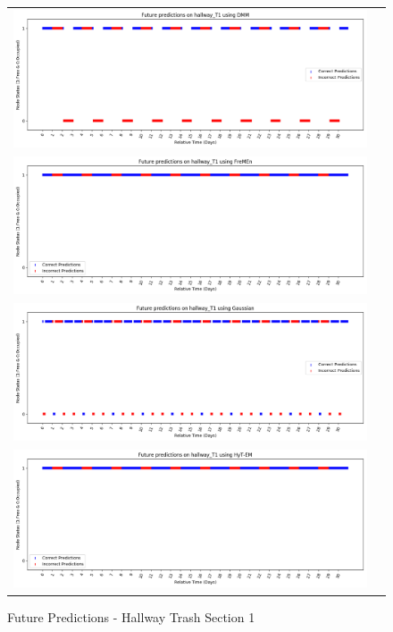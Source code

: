 \begin{center}
\begin{figure}[!Hp]
  \begin{tabular}{cc}
    {\includegraphics[width = 6in]{images/results/Future_hallway_T1_DMM.png}} \\
    {\includegraphics[width = 6in]{images/results/Future_hallway_T1_FreMEn.png}} \\
    {\includegraphics[width = 6in]{images/results/Future_hallway_T1_Gaussian.png}} \\
    {\includegraphics[width = 6in]{images/results/Future_hallway_T1_HyT-EM.png}} \\
  \end{tabular}
  \caption{Future Predictions - Hallway Trash Section 1}
\end{figure}


\end{center}
